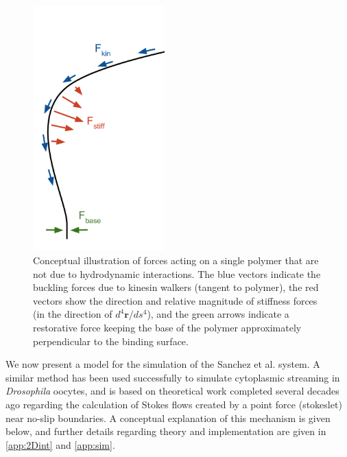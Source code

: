 \documentclass[11pt]{ucthesis}
\begin{document}
\begin{figure}
\begin{center}
\includegraphics[width = 2in]{MT_forces}
\caption{Conceptual illustration of forces acting on a single polymer
that are not due to hydrodynamic interactions. The blue vectors
indicate the buckling forces due to kinesin walkers (tangent to
polymer), the red vectors show the direction and relative magnitude
of stiffness forces (in the direction of $d^4\mathbf{r}/ds^4$), and
the green arrows indicate a restorative force keeping the base of
the polymer approximately perpendicular to the binding
surface.
\label{fig:Mtforces}
}
\end{center}
\end{figure}


We now present a model for the simulation of the Sanchez
et al. system. A similar method has been used successfully to
simulate cytoplasmic streaming in \textit{Drosophila}
oocytes\cite{Monteith2016}, and is based on theoretical
work completed several decades ago regarding the calculation of
Stokes flows created by a point force (stokeslet) near no-slip
boundaries\cite{Blake1971,Liron1976}. A conceptual explanation of
this mechanism is given below, and further details regarding theory
and implementation are given in \ref{app:2Dint} and
\ref{app:sim}.
\end{document}
